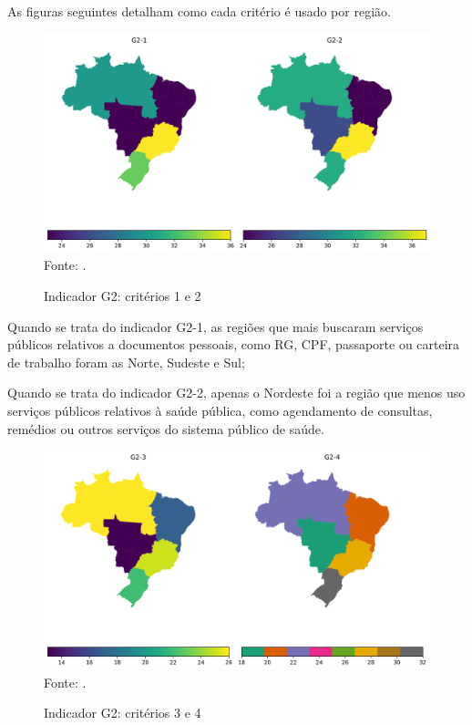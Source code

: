 As figuras seguintes detalham como cada critério é usado por região.

\begin{figure}[H]
	\centering
	\caption{Indicador G2: critérios 1 e 2}
	\includegraphics[width=1\linewidth]{figuras/mapa_coropletico_tic_domicilios_2024_g2_1_2.png}
	\label{fig:mapa_coropletico_tic_domicilios_2024_g2_1_2}
	\footnotesize{Fonte: \cite{tic_domicilios_2024_g2}.}
\end{figure}

Quando se trata do indicador G2-1, as regiões que mais buscaram serviços públicos relativos a documentos pessoais, como RG, CPF, passaporte ou carteira de trabalho foram as Norte, Sudeste e Sul;

Quando se trata do indicador G2-2, apenas o Nordeste foi a região que menos uso serviços públicos relativos à saúde pública, como agendamento de consultas, remédios ou outros serviços do sistema público de saúde.

\begin{figure}[H]
	\centering
	\caption{Indicador G2: critérios 3 e 4}
	\includegraphics[width=1\linewidth]{figuras/mapa_coropletico_tic_domicilios_2024_g2_3_4.png}
	\label{fig:mapa_coropletico_tic_domicilios_2024_g2_3_4}
	\footnotesize{Fonte: \cite{tic_domicilios_2024_g2}.}
\end{figure}

